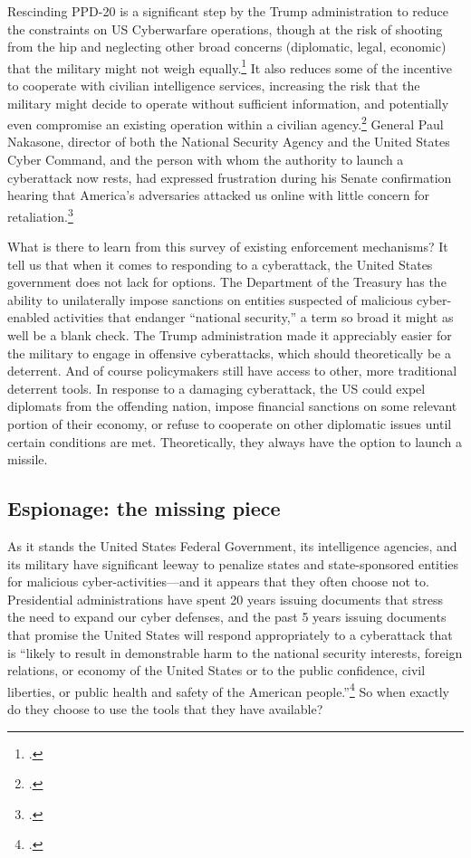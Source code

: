 \documentclass{memoir}
\begin{document}
\begin{refsegment}
Rescinding PPD-20 is a significant step by the Trump administration to reduce the constraints on US Cyberwarfare operations, though at the risk of shooting from the hip and neglecting other broad concerns (diplomatic, legal, economic) that the military might not weigh equally.\footcite{starks_ramifications_2018} It also reduces some of the incentive to cooperate with civilian intelligence services, increasing the risk that the military might decide to operate without sufficient information, and potentially even compromise an existing operation within a civilian agency.\footcite{hawkins_cybersecurity_2018} General Paul Nakasone, director of both the National Security Agency and the United States Cyber Command, and the person with whom the authority to launch a cyberattack now rests, had expressed frustration during his Senate confirmation hearing that America's adversaries attacked us online with little concern for retaliation.\footcite{sanger_trump_2018}

What is there to learn from this survey of existing enforcement mechanisms? It tell us that when it comes to responding to a cyberattack, the United States government does not lack for options. The Department of the Treasury has the ability to unilaterally impose sanctions on entities suspected of malicious cyber-enabled activities that endanger ``national security,'' a term so broad it might as well be a blank check. The Trump administration made it appreciably easier for the military to engage in offensive cyberattacks, which should theoretically be a deterrent. And of course policymakers still have access to other, more traditional deterrent tools. In response to a damaging cyberattack, the US could expel diplomats from the offending nation, impose financial sanctions on some relevant portion of their economy, or refuse to cooperate on other diplomatic issues until certain conditions are met. Theoretically, they always have the option to launch a missile.

\subsection{Espionage: the missing piece}
As it stands the United States Federal Government, its intelligence agencies, and its military have significant leeway to penalize states and state-sponsored entities for malicious cyber-activities---and it appears that they often choose not to. Presidential administrations have spent 20 years issuing documents that stress the need to expand our cyber defenses, and the past 5 years issuing documents that promise the United States will respond appropriately to a cyberattack that is ``likely to result in demonstrable harm to the national security interests, foreign relations, or economy of the United States or to the public confidence, civil liberties, or public health and safety of the American people.''\footcite{office_of_the_press_secretary_fact_2016} So when exactly do they choose to use the tools that they have available?


\end{refsegment}
\end{document}
